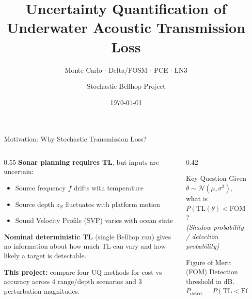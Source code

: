 \documentclass[aspectratio=169,12pt]{beamer}
\title[Stochastic TL UQ]{Uncertainty Quantification of\\Underwater Acoustic Transmission Loss}
\subtitle{Monte Carlo $\cdot$ Delta/FOSM $\cdot$ PCE $\cdot$ LN3}
\author{Stochastic Bellhop Project}
\date{\today}
\newcommand{\TL}{\mathrm{TL}}
\begin{document}
\begin{frame}
  \titlepage
\end{frame}

\begin{frame}{Motivation: Why Stochastic Transmission Loss?}
  \begin{columns}[T]
    \begin{column}{0.55\textwidth}
      \textbf{Sonar planning requires TL}, but inputs are uncertain:
      \begin{itemize}
        \item Source frequency $f$ drifts with temperature
        \item Source depth $z_S$ fluctuates with platform motion
        \item Sound Velocity Profile (SVP) varies with ocean state
      \end{itemize}
      \vspace{0.8em}
      \textbf{Nominal deterministic TL} (single Bellhop run) gives
      no information about \alert{how much} TL can vary and
      \alert{how likely} a target is detectable.

      \vspace{0.8em}
      \textbf{This project:} compare four UQ methods for cost vs accuracy
      across 4 range/depth scenarios and 3 perturbation magnitudes.
    \end{column}
    \begin{column}{0.42\textwidth}
      \begin{block}{Key Question}
        Given $\theta \sim \mathcal{N}(\mu,\sigma^2)$,\\[3pt]
        what is $P(\TL(\theta) < \mathrm{FOM})$?\\[6pt]
        \textit{(Shadow probability / detection probability)}
      \end{block}
      \vspace{0.5em}
      \begin{alertblock}{Figure of Merit (FOM)}
        Detection threshold in dB.\\
        $P_{\text{detect}} = P(\TL < \mathrm{FOM})$
      \end{alertblock}
    \end{column}
  \end{columns}
\end{frame}
\end{document}
